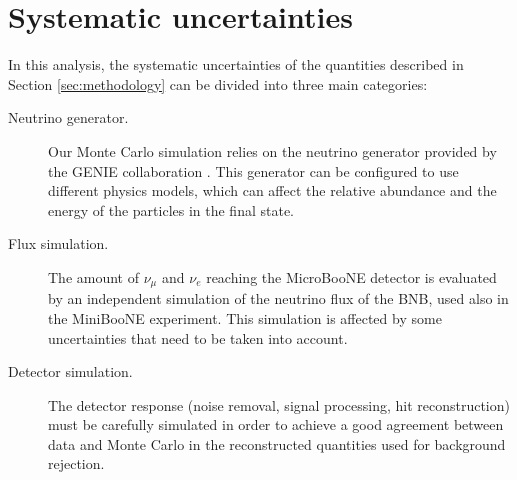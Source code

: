 \section{Systematic uncertainties}\label{sec:systematics}
In this analysis, the systematic uncertainties of the quantities described in Section \ref{sec:methodology} can be divided into three main categories: 
\begin{description}
\item[Neutrino generator.] Our Monte Carlo simulation relies on the neutrino generator provided by the GENIE collaboration \cite{Andreopoulos:2009rq}. This generator can be configured to use different physics models, which can affect the relative abundance and the energy of the particles in the final state.
\item[Flux simulation.] The amount of $\nu_{\mu}$ and $\nu_{e}$ reaching the MicroBooNE detector is evaluated by an independent simulation of the neutrino flux of the BNB, used also in the MiniBooNE experiment. This simulation is affected by some uncertainties that need to be taken into account.
\item[Detector simulation.] The detector response (noise removal, signal processing, hit reconstruction) must be carefully simulated in order to achieve a good agreement between data and Monte Carlo in the reconstructed quantities used for background rejection. 
\end{description}

